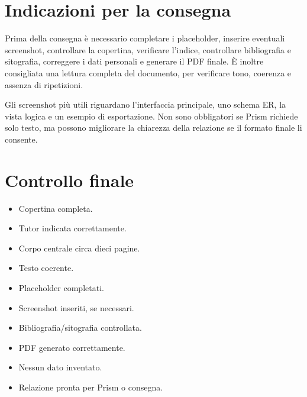 \section{Indicazioni per la consegna}

Prima della consegna è necessario completare i placeholder, inserire eventuali screenshot, controllare la copertina, verificare l'indice, controllare bibliografia e sitografia, correggere i dati personali e generare il PDF finale. È inoltre consigliata una lettura completa del documento, per verificare tono, coerenza e assenza di ripetizioni.

Gli screenshot più utili riguardano l'interfaccia principale, uno schema ER, la vista logica e un esempio di esportazione. Non sono obbligatori se Prism richiede solo testo, ma possono migliorare la chiarezza della relazione se il formato finale li consente.

\section{Controllo finale}

\begin{itemize}
    \item[$\square$] Copertina completa.
    \item[$\square$] Tutor indicata correttamente.
    \item[$\square$] Corpo centrale circa dieci pagine.
    \item[$\square$] Testo coerente.
    \item[$\square$] Placeholder completati.
    \item[$\square$] Screenshot inseriti, se necessari.
    \item[$\square$] Bibliografia/sitografia controllata.
    \item[$\square$] PDF generato correttamente.
    \item[$\square$] Nessun dato inventato.
    \item[$\square$] Relazione pronta per Prism o consegna.
\end{itemize}
